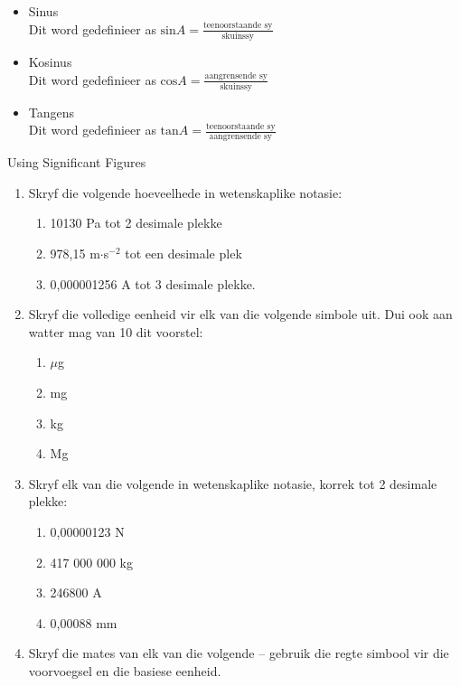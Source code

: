 \begin{itemize}
 \item Sinus\\
Dit word gedefinieer as $\text{sin} A = \frac{\text{teenoorstaande sy}}{\text{skuinssy}}$
\item Kosinus \\
Dit word gedefinieer as $\text{cos} A = \frac{\text{aangrensende sy}}{\text{skuinssy}}$
\item Tangens \\
Dit word gedefinieer as $\text{tan} A = \frac{\text{teenoorstaande sy}}{\text{aangrensende sy}}$
\end{itemize}
\begin{exercises}{Using Significant Figures }
            \nopagebreak
\begin{enumerate}[noitemsep, label=\textbf{\arabic*}. ] 
\item Skryf die volgende hoeveelhede in wetenskaplike notasie:
\begin{enumerate}[noitemsep, label=\textbf{\alph*}. ] 
\item 10130 Pa tot 2 desimale plekke
\item 978,15 m$\ensuremath{\cdot}$s${}^{-2}$ tot een desimale plek
\item 0,000001256 A tot 3 desimale plekke.
\end{enumerate}
\item Skryf die volledige eenheid vir elk van die volgende simbole uit. Dui ook aan watter mag van 10 dit voorstel:
  \begin{enumerate}[noitemsep, label=\textbf{\alph*}. ] 
  \item $\mu $g
  \item mg
  \item kg
  \item Mg
  \end{enumerate}
\item Skryf elk van die volgende in wetenskaplike notasie, korrek tot 2 desimale plekke:
  \begin{enumerate}[noitemsep, label=\textbf{\alph*}. ] 
  \item 0,00000123 N
  \item 417 000 000 kg
  \item 246800 A
  \item 0,00088 mm
  \end{enumerate}
\item Skryf die mates van elk van die volgende – gebruik die regte simbool vir die voorvoegsel en die basiese eenheid.

\end{enumerate}
\end{exercises}

